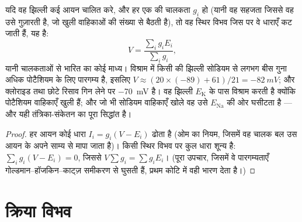 \begin{theorem}[भारित माध्य के रूप में विश्राम विभव]\label{thm:b2:neurons-synapses:chord}
यदि वह झिल्ली कई आयन चालित करे, और हर एक की चालकता $g_i$ हो
(यानी वह सहजता जिससे वह उसे गुज़ारती है, जो खुली वाहिकाओं की संख्या से बैठती है),
तो वह स्थिर विभव जिस पर वे धाराएँ कट जाती हैं, यह है:
\[
V = \frac{\sum_i g_i E_i}{\sum_i g_i},
\]
यानी चालकताओं से भारित  का कोई माध्य।
विश्राम में किसी  की झिल्ली सोडियम से लगभग बीस गुना अधिक
पोटैशियम के लिए पारगम्य है, इसलिए $V \approx (20\times(-89) +
61)/21 = \qty{-82}{mV}$; और क्लोराइड तथा छोटे रिसाव
गिन लेने पर  \qty{-70}{mV} है। वह झिल्ली
$E_{\mathrm K}$ के पास विश्राम करती है क्योंकि पोटैशियम वाहिकाएँ खुली हैं; और जो भी
सोडियम वाहिकाएँ खोले वह उसे $E_{\mathrm{Na}}$ की ओर घसीटता है --- और यही
तंत्रिका-संकेतन का पूरा सिद्धांत है।
\end{theorem}
\begin{proof}
हर आयन कोई धारा $I_i = g_i(V - E_i)$ ढोता है (ओम का नियम, जिसमें
वह चालक बल उस आयन के अपने साम्य से मापा जाता है)। किसी
स्थिर विभव पर कुल धारा शून्य है: $\sum_i g_i(V - E_i) =
0$, जिससे $V\sum g_i = \sum g_iE_i$। (पूरा उपचार, जिसमें
वे पारगम्यताएँ गोल्डमान--हॉजकिन--काट्ज़
समीकरण से घुसती हैं, प्रथम कोटि में वही भारण देता है।)
\end{proof}

\section{क्रिया विभव}

